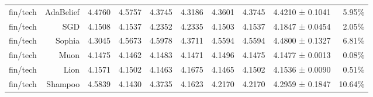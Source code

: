 \begin{table}[t]
\begin{tabular}{lrrrrrrrrr}
fin/tech & AdaBelief & 4.4760 & 4.5757 & 4.3745 & 4.3186 & 4.3601 & 4.3745 & 4.4210 ± 0.1041 & 5.95\% \\
fin/tech & SGD & 4.1508 & 4.1537 & 4.2352 & 4.2335 & 4.1503 & 4.1537 & 4.1847 ± 0.0454 & 2.05\% \\
fin/tech & Sophia & 4.3045 & 4.5673 & 4.5978 & 4.3711 & 4.5594 & 4.5594 & 4.4800 ± 0.1327 & 6.81\% \\
fin/tech & Muon & 4.1475 & 4.1462 & 4.1483 & 4.1471 & 4.1496 & 4.1475 & 4.1477 ± 0.0013 & 0.08\% \\
fin/tech & Lion & 4.1571 & 4.1502 & 4.1463 & 4.1675 & 4.1465 & 4.1502 & 4.1536 ± 0.0090 & 0.51\% \\
fin/tech & Shampoo & 4.5839 & 4.1430 & 4.3735 & 4.1623 & 4.2170 & 4.2170 & 4.2959 ± 0.1847 & 10.64\% \\
\bottomrule
\end{tabular}
\end{table}
